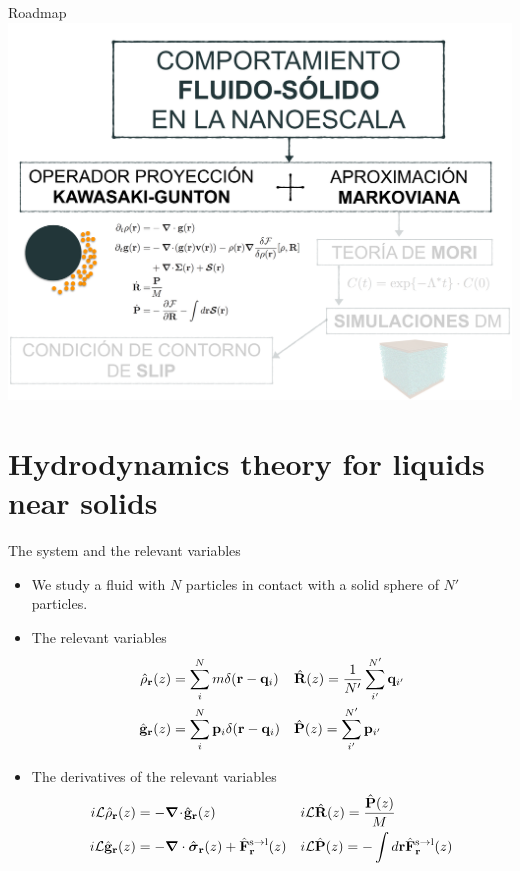 \documentclass{beamer}
\newcommand{\esc}{\!\cdot\!}
\begin{document}
\begin{frame}{Roadmap}
  \includegraphics[width=\linewidth]{scheme-thesis-kawasaki}
\end{frame}

\section{Hydrodynamics theory for liquids near solids}
\begin{frame}{The system and the relevant variables}
  \begin{itemize}
    \item<1-> We study a fluid with $N$ particles in contact with a solid sphere of $N'$ particles.
    \item<2-> The relevant variables 
      \begin{align}
        \hat{\rho}_{\bf r}(z) &=\sum^{N}_im\delta({\bf r}-{\bf q}_i)
      &&\hat{\bf R}(z)=\frac{1}{N'}\sum_{i'}^{N'}{\bf q}_{i'}
      \nonumber\\
        \hat{\bf g}_{\bf r}(z) &=\sum^{N}_i{\bf p}_i\delta({\bf r}-{\bf q}_i)
      &&\hat{\bf P}(z)=\sum_{i'}^{N'}{\bf p}_{i'}
      \nonumber
      \end{align}
    \item<3-> The derivatives of the relevant variables
      \begin{align}
        i{\cal L} \hat{\rho}_{\bf r}(z) &= -\boldsymbol{\nabla}\esc\hat{\bf g}_{\bf r}(z)
        && i{\cal L}\hat{\bf R}(z) =\frac{\hat{\bf P}(z)}{M}
      \nonumber\\
      i{\cal L}\hat{\bf g}_{\bf r}(z)
          &=-\boldsymbol{\nabla}\cdot \hat{\boldsymbol{\sigma}}_{\bf r}(z)+\hat{{\bf F}}^{\rm s\to l}_{\bf r}(z) 
        &&i{\cal L}\hat{\bf P}(z) =-\int  d{\bf r} \hat{\bf F}^{\rm s\to l}_{\bf r}(z)
         \nonumber
\end{align}
    \end{itemize}
\end{frame}
\end{document}

